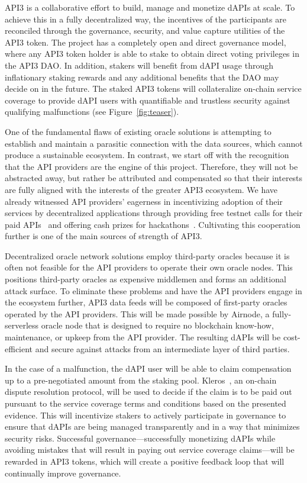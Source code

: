 \documentclass[11pt]{article}
\begin{document}
API3 is a collaborative effort to build, manage and monetize dAPIs at scale.
To achieve this in a fully decentralized way, the incentives of the participants are reconciled through the governance, security, and value capture utilities of the API3 token.
The project has a completely open and direct governance model, where any API3 token holder is able to stake to obtain direct voting privileges in the API3 DAO.
In addition, stakers will benefit from dAPI usage through inflationary staking rewards and any additional benefits that the DAO may decide on in the future.
The staked API3 tokens will collateralize on-chain service coverage to provide dAPI users with quantifiable and trustless security against qualifying malfunctions (see Figure~\ref{fig:teaser}).

One of the fundamental flaws of existing oracle solutions is attempting to establish and maintain a parasitic connection with the data sources, which cannot produce a sustainable ecosystem.
In contrast, we start off with the recognition that the API providers are the engine of this project.
Therefore, they will not be abstracted away, but rather be attributed and compensated so that their interests are fully aligned with the interests of the greater API3 ecosystem.
We have already witnessed API providers’ eagerness in incentivizing adoption of their services by decentralized applications through providing free testnet calls for their paid APIs~\cite{honeycomb.market} and offering cash prizes for hackathons~\cite{honeycomb-hackathon}.
Cultivating this cooperation further is one of the main sources of strength of API3.

Decentralized oracle network solutions employ third-party oracles because it is often not feasible for the API providers to operate their own oracle nodes.
This positions third-party oracles as expensive middlemen and forms an additional attack surface.
To eliminate these problems and have the API providers engage in the ecosystem further, API3 data feeds will be composed of first-party oracles operated by the API providers.
This will be made possible by Airnode, a fully-serverless oracle node that is designed to require no blockchain know-how, maintenance, or upkeep from the API provider.
The resulting dAPIs will be cost-efficient and secure against attacks from an intermediate layer of third parties.

In the case of a malfunction, the dAPI user will be able to claim compensation up to a pre-negotiated amount from the staking pool.
Kleros~\cite{kleros:2019}, an on-chain dispute resolution protocol, will be used to decide if the claim is to be paid out pursuant to the service coverage terms and conditions based on the presented evidence.
This will incentivize stakers to actively participate in governance to ensure that dAPIs are being managed transparently and in a way that minimizes security risks.
Successful governance---successfully monetizing dAPIs while avoiding mistakes that will result in paying out service coverage claims---will be rewarded in API3 tokens, which will create a positive feedback loop that will continually improve governance.
\end{document}
